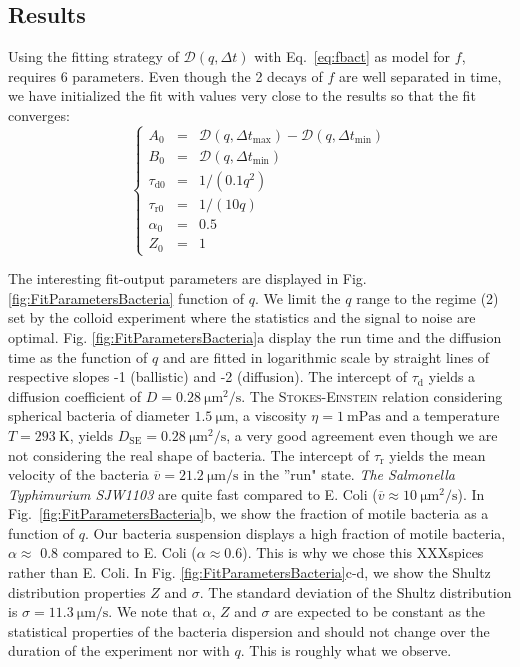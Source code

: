 \documentclass[prb,reprint,amsmath,amssymb]{revtex4-1}
\newcommand{\tg}[1]{{\color{magenta}#1}} %
\begin{document}
\subsection{Results}
\tg {Using the fitting strategy of $\mathcal{D}(q, \Delta t)$} with Eq.~\eqref{eq:fbact} as model for $f$, requires 6 parameters. Even though the 2 decays of $f$ are well separated in time, we have initialized the fit with values very close to the results so that the fit converges:
\begin{equation}
\left\{
\begin{array}{rcl}
A_0 &=& \mathcal{D} (q,\Delta t_\text{max}) - \mathcal{D} (q,\Delta t_\text{min}) \\
B_0 &=& \mathcal{D} (q,\Delta t_\text{min}) \\
\tau_\text{d0} &=& 1/(0.1 q^{2})\\
\tau_\text{r0} &=& 1/(10 q)\\
\alpha_0 &=& 0.5\\
Z_0 &=& 1
\end{array}
\right.
\end{equation}

The interesting fit-output parameters are displayed in Fig. \ref{fig:FitParametersBacteria} function of $q$. We limit the $q$ range to the regime (2) set by the colloid experiment where the statistics and the signal to noise are optimal. \tg{Fig. \ref{fig:FitParametersBacteria}a display the run time and the diffusion time as the function of $q$ and are fitted in logarithmic scale by straight lines of respective slopes -1 (ballistic) and -2 (diffusion). The intercept of $\tau_\text{d}$ yields a diffusion coefficient of  $D = \SI{0.28}{\micro\meter\squared\per\second}$. The \textsc{Stokes-Einstein} relation considering spherical bacteria of diameter $\SI{1.5}{\micro\meter}$, a viscosity $\eta = \SI{1}{\milli\pascal\second}$ and a temperature $T=\SI{293}{\kelvin}$, yields $D_\text{SE} = \SI{0.28}{\micro\meter\squared\per\second}$, a very good agreement even though we are not considering the real shape of bacteria. The intercept of $\tau_\text{r}$  yields the mean velocity of the bacteria $\overline{v} = \SI{21.2}{\micro\meter\per\second}$ in the ''run" state. \textit{The Salmonella Typhimurium SJW1103}  are quite fast compared to E. Coli ($\overline{v} \approx \SI{10}{\micro\meter\squared\per\second}$)\cite{4_Martinez20121637}. In Fig.~\ref{fig:FitParametersBacteria}b, we show the fraction of motile bacteria as a function of $q$. Our bacteria suspension displays a high fraction of motile bacteria, $\alpha\approx$ 0.8 compared to E. Coli ($\alpha\approx 0.6$)\cite{4_Martinez20121637}. This is why we chose this XXXspices rather than  E. Coli. In Fig. \ref{fig:FitParametersBacteria}c-d, we show the Shultz distribution properties $Z$ and $\sigma$. The standard deviation of the  Shultz distribution is $\sigma=\SI{11.3}{\micro\meter\per\second}$. We note that $\alpha$, $Z$ and $\sigma$ are expected to be constant as the statistical properties of the bacteria dispersion and should not change over the duration of the experiment nor with $q$. This is roughly what we observe.}
\end{document}

